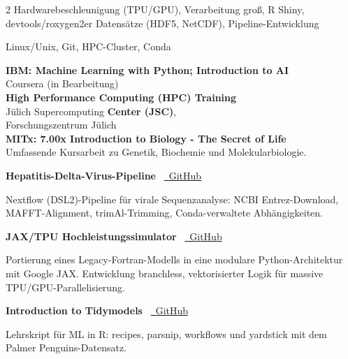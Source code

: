 \documentclass{thejus_cv}
\begin{document}
\begin{paracol}{2}
         {Hardwarebeschleunigung (TPU/GPU), Verarbeitung gro{\ss, R Shiny, devtools/roxygen2}er Datens\"atze (HDF5, NetCDF), Pipeline-Entwicklung}

         {Linux/Unix, Git, HPC-Cluster, Conda}



\textbf{IBM: Machine Learning with Python; Introduction to AI}\\
{\small Coursera (in Bearbeitung)}\\[0.3cm]

\textbf{High Performance Computing (HPC) Training}\\
J\"ulich Supercomputing \textbf{Center (JSC)},\\
Forschungszentrum J\"ulich\\[0.3cm]

\textbf{MITx: 7.00x Introduction to Biology - The Secret of Life}\\
{\small Umfassende Kursarbeit zu Genetik, Biochemie und Molekularbiologie.}\\[0.4cm]


\textbf{Hepatitis-Delta-Virus-Pipeline} \textbullet\ \href{https://github.com/thejusmahajan/hepatitis-delta-pipeline}{\faGithub\ GitHub}\par
{\small Nextflow (DSL2)-Pipeline f\"ur virale Sequenzanalyse: NCBI Entrez-Download, MAFFT-Alignment, trimAl-Trimming, Conda-verwaltete Abh\"angigkeiten.}\par
\vspace{0.3em}

\textbf{JAX/TPU Hochleistungssimulator} \textbullet\ \href{https://github.com/thejusmahajan/Agent_Based_Phytoplankton_Model-IBM-Phytoplankton}{\faGithub\ GitHub}\par
{\small Portierung eines Legacy-Fortran-Modells in eine modulare Python-Architektur mit Google JAX. Entwicklung branchless, vektorisierter Logik f\"ur massive TPU/GPU-Parallelisierung.}\par
\vspace{0.3em}

\textbf{Introduction to Tidymodels} \textbullet\ \href{https://github.com/thejusmahajan/Introduction_to_Tidymodels}{\faGithub\ GitHub}\par
{\small Lehrskript f\"ur ML in R: recipes, parsnip, workflows und yardstick mit dem Palmer Penguins-Datensatz.}\par
\vspace{0.3em}


\end{paracol}
\end{document}
